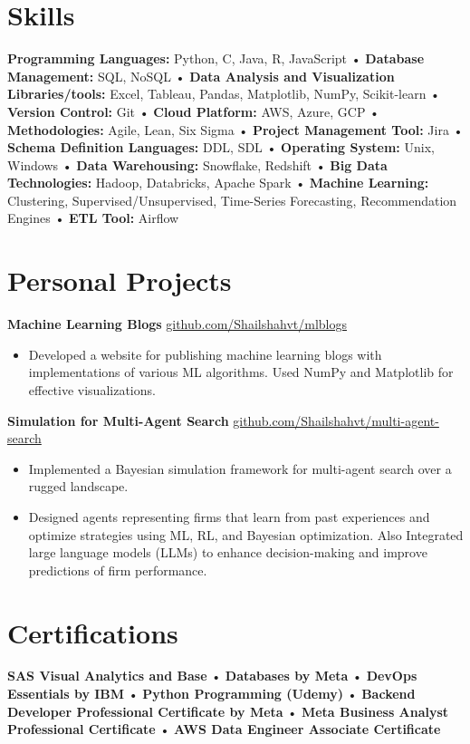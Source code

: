 \documentclass[10pt, letterpaper]{article}
\begin{document}
\section{Skills}

\textbf{Programming Languages:} Python, C, Java, R, JavaScript • \textbf{Database Management:} SQL, NoSQL • \textbf{Data Analysis and Visualization Libraries/tools:} Excel, Tableau, Pandas, Matplotlib, NumPy, Scikit-learn • \textbf{Version Control:} Git • \textbf{Cloud Platform:} AWS, Azure, GCP • \textbf{Methodologies:} Agile, Lean, Six Sigma • \textbf{Project Management Tool:} Jira • \textbf{Schema Definition Languages:} DDL, SDL • \textbf{Operating System:} Unix, Windows • \textbf{Data Warehousing:} Snowflake, Redshift • \textbf{Big Data Technologies:} Hadoop, Databricks, Apache Spark • \textbf{Machine Learning:} Clustering, Supervised/Unsupervised, Time-Series Forecasting, Recommendation Engines • \textbf{ETL Tool:} Airflow

\section{Personal Projects}

\textbf{Machine Learning Blogs} \hfill \href{https://shail-shah.github.io/posts/Probability/ProbabilityDist.html}{github.com/Shailshahvt/mlblogs}  
\begin{itemize}[itemsep=3pt, topsep=5pt, parsep=3pt]
    \item Developed a website for publishing machine learning blogs with implementations of various ML algorithms. Used NumPy and Matplotlib for effective visualizations.
\end{itemize}

\textbf{Simulation for Multi-Agent Search} \hfill \href{https://github.com/Shailshahvt/multisim}{github.com/Shailshahvt/multi-agent-search}  
\begin{itemize}[itemsep=3pt, topsep=5pt, parsep=3pt]
    \item Implemented a Bayesian simulation framework for multi-agent search over a rugged landscape.
    \item Designed agents representing firms that learn from past experiences and optimize strategies using ML, RL, and Bayesian optimization. Also Integrated large language models (LLMs) to enhance decision-making and improve predictions of firm performance.
\end{itemize}


\section{Certifications}

\textbf{SAS Visual Analytics and Base} • \textbf{Databases by Meta} • \textbf{DevOps Essentials by IBM} • \textbf{Python Programming (Udemy)} • \textbf{Backend Developer Professional Certificate by Meta} • \textbf{Meta Business Analyst Professional Certificate} • \textbf{AWS Data Engineer Associate Certificate}
\end{document}
